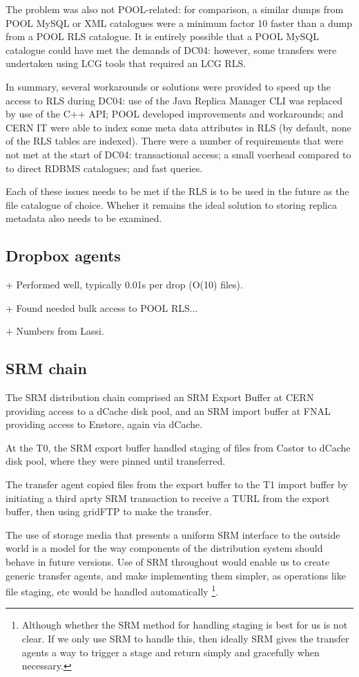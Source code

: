 \documentclass{cmspaper}
\begin{document}
The problem was also not POOL-related: for comparison, a similar dumps from POOL MySQL or XML catalogues were a minimum factor 10 faster than a dump from a POOL RLS catalogue. It is entirely possible that a POOL MySQL catalogue could have met the demands of DC04: however, some transfers were undertaken using LCG tools that required an LCG RLS.

In summary, several workarounds or solutions were provided to speed up the access to RLS during DC04: use of the Java Replica Manager CLI was replaced by use of the C++ API; POOL developed improvements and workarounds; and CERN IT were able to index some meta data attributes in RLS (by default, none of the RLS tables are indexed). There were a number of requirements that were not met at the start of DC04: transactional access; a small voerhead compared to to direct RDBMS catalogues; and fast queries.

Each of these issues needs to be met if the RLS is to be used in the future as the file catalogue of choice. Wheher it remains the ideal solution to storing replica metadata also needs to be examined.

\subsection{Dropbox agents}
+ Performed well, typically 0.01s per drop (O(10) files).

+ Found needed bulk access to POOL RLS...

+ Numbers from Lassi.

\subsection{SRM chain}
The SRM distribution chain comprised an SRM Export Buffer at CERN providing access to a dCache disk pool, and an SRM import buffer at FNAL providing access to Enstore, again via dCache. 

At the T0, the SRM export buffer handled staging of files from Castor to dCache disk pool, where they were pinned until transferred.

The transfer agent copied files from the export buffer to the T1 import buffer by initiating a third aprty SRM transaction to receive a TURL from the export buffer, then using gridFTP to make the transfer.

The use of storage media that presents a uniform SRM interface to the outside world is a model for the way components of the distribution system should behave in future versions. Use of SRM throughout would enable us to create generic transfer agents, and make implementing them simpler, as operations like file staging, etc would be handled automatically \footnote{Although whether the SRM method for handling staging is best for us is not clear. If we only use SRM to handle this, then ideally SRM gives the transfer agents a way to trigger a stage and return simply and gracefully when necessary.}.
\end{document}
